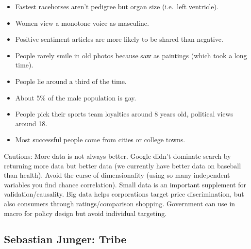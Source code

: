 \documentclass[
]{article}
\begin{document}
\begin{itemize}
\item
  Fastest racehorses aren't pedigree but organ size (i.e.~left
  ventricle).
\item
  Women view a monotone voice as masculine.
\item
  Positive sentiment articles are more likely to be shared than
  negative.
\item
  People rarely smile in old photos because saw as paintings (which took
  a long time).
\item
  People lie around a third of the time.
\item
  About 5\% of the male population is gay.
\item
  People pick their sports team loyalties around 8 years old, political
  views around 18.
\item
  Most successful people come from cities or college towns.
\end{itemize}

Cautions: More data is not always better. Google didn't dominate search
by returning more data but better data (we currently have better data on
baseball than health). Avoid the curse of dimensionality (using so many
independent variables you find chance correlation). Small data is an
important supplement for validation/causality. Big data helps
corporations target price discrimination, but also consumers through
ratings/comparison shopping. Government can use in macro for policy
design but avoid individual targeting.

\hypertarget{sebastian-junger-tribe}{%
\subsection{Sebastian Junger: Tribe}\label{sebastian-junger-tribe}}
\end{document}
